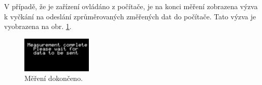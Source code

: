 V případě, že je zařízení ovládáno z počítače, je na konci měření zobrazena výzva k vyčkání na odeslání zprůměrovaných změřených dat do počítače. Tato výzva je vyobrazena na obr. \ref{measurement_complete}.
\begin{figure}[H]
\includegraphics[width=0.3\textwidth,keepaspectratio,interpolate=false]{images/measurement_complete.png}\caption{Měření dokončeno.}\label{measurement_complete}
\end{figure}